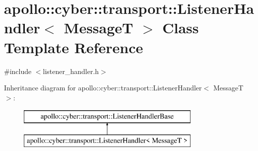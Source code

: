 \hypertarget{classapollo_1_1cyber_1_1transport_1_1ListenerHandler}{\section{apollo\-:\-:cyber\-:\-:transport\-:\-:Listener\-Handler$<$ Message\-T $>$ Class Template Reference}
\label{classapollo_1_1cyber_1_1transport_1_1ListenerHandler}
}


{\ttfamily \#include $<$listener\-\_\-handler.\-h$>$}

Inheritance diagram for apollo\-:\-:cyber\-:\-:transport\-:\-:Listener\-Handler$<$ Message\-T $>$\-:\begin{figure}[H]
\begin{center}
\leavevmode
\includegraphics[height=2.000000cm]{classapollo_1_1cyber_1_1transport_1_1ListenerHandler}
\end{center}
\end{figure}
